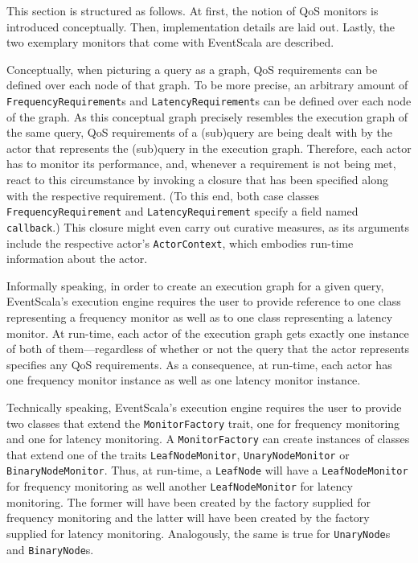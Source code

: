 \documentclass[article, 10pt, type=bsc, colorback, accentcolor=tud8b, parskip=half, bibliography=totocnumbered]{tudthesis}
\begin{document}
This section is structured as follows.
At first, the notion of QoS monitors is introduced conceptually.
Then, implementation details are laid out.
Lastly, the two exemplary monitors that come with EventScala are described.

Conceptually, when picturing a query as a graph, QoS requirements can be defined over each node of that graph.
To be more precise, an arbitrary amount of \lstinline{FrequencyRequirement}s and \lstinline{LatencyRequirement}s can be defined over each node of the graph.
As this conceptual graph precisely resembles the execution graph of the same query, QoS requirements of a (sub)query are being dealt with by the actor that represents the (sub)query in the execution graph.
Therefore, each actor has to monitor its performance, and, whenever a requirement is not being met, react to this circumstance by invoking a closure that has been specified along with the respective requirement.
(To this end, both case classes \lstinline{FrequencyRequirement} and \lstinline{LatencyRequirement} specify a field named \lstinline{callback}.)
This closure might even carry out curative measures, as its arguments include the respective actor's \lstinline{ActorContext}, which embodies run-time information about the actor.

Informally speaking, in order to create an execution graph for a given query, EventScala's execution engine requires the user to provide reference to one class representing a frequency monitor as well as to one class representing a latency monitor.
At run-time, each actor of the execution graph gets exactly one instance of both of them---regardless of whether or not the query that the actor represents specifies any QoS requirements.
As a consequence, at run-time, each actor has one frequency monitor instance as well as one latency monitor instance.

Technically speaking, EventScala's execution engine requires the user to provide two classes that extend the \lstinline{MonitorFactory} trait, one for frequency monitoring and one for latency monitoring.
A \lstinline{MonitorFactory} can create instances of classes that extend one of the traits \lstinline{LeafNodeMonitor}, \lstinline{UnaryNodeMonitor} or \lstinline{BinaryNodeMonitor}.
Thus, at run-time, a \lstinline{LeafNode} will have a \lstinline{LeafNodeMonitor} for frequency monitoring as well another \lstinline{LeafNodeMonitor} for latency monitoring.
The former will have been created by the factory supplied for frequency monitoring and the latter will have been created by the factory supplied for latency monitoring.
Analogously, the same is true for \lstinline{UnaryNode}s and \lstinline{BinaryNode}s.
\end{document}
